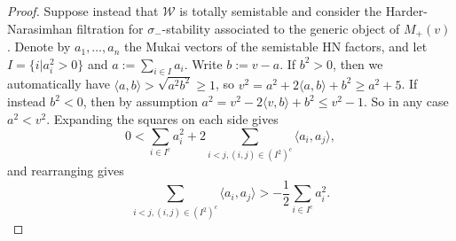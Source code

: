 \documentclass[leqno,11pt]{amsart}
\theoremstyle{definition}
\def\WW{\ensuremath{\mathcal W}}
\begin{document}
\begin{proof}
Suppose instead that $\WW$ is totally semistable and consider the Harder-Narasimhan filtration for $\sigma_-$-stability associated to the generic object of $M_+(v)$.  Denote by $a_1,\ldots,a_n$ the Mukai vectors of the semistable HN factors, and let $I=\{i|a_i^2>0\}$ and $a:=\sum_{i\in I}a_i$.  Write $b:=v-a$.  If $b^2>0$, then we automatically have $\langle a,b\rangle>\sqrt{a^2 b^2}\geq 1$, so $v^2=a^2+2\langle a,b\rangle+b^2\geq a^2+5$.  If instead $b^2<0$, then by assumption $a^2=v^2-2\langle v,b\rangle+b^2\leq v^2-1$.  So in any case $a^2<v^2$.  Expanding the squares on each side gives $$0<\sum_{i\in I^c}a_i^2+2\sum_{i<j,(i,j)\in (I^2)^c}\langle a_i,a_j\rangle,$$ and rearranging gives \begin{equation}\label{non-isotropic estimate}
\sum_{i<j,(i,j)\in (I^2)^c}\langle a_i,a_j\rangle > -\frac{1}{2}\sum_{i\in I^c}a_i^2.\end{equation}


\end{proof}
\end{document}
